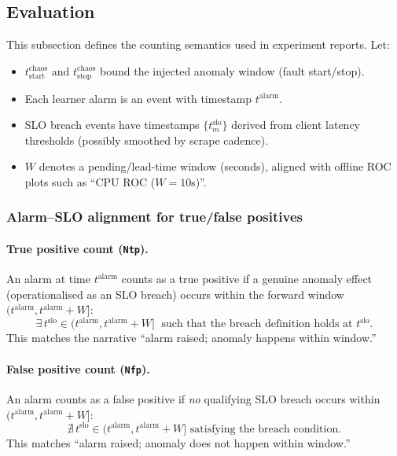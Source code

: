 \documentclass[11pt,a4paper]{article}
\begin{document}
\subsection{Evaluation}
\label{subsec:evaluation}

This subsection defines the counting semantics used in experiment reports. Let:
\begin{itemize}[leftmargin=*]
  \item $t^{\mathrm{chaos}}_{\mathrm{start}}$ and $t^{\mathrm{chaos}}_{\mathrm{stop}}$ bound the injected anomaly window (fault start/stop).
  \item Each learner alarm is an event with timestamp $t^{\mathrm{alarm}}$.
  \item SLO breach events have timestamps $\{t^{\mathrm{slo}}_m\}$ derived from client latency thresholds (possibly smoothed by scrape cadence).
  \item $W$ denotes a pending/lead-time window (seconds), aligned with offline ROC plots such as ``CPU ROC ($W{=}10$s)''.
\end{itemize}

\subsubsection*{Alarm--SLO alignment for true/false positives}

\paragraph{True positive count (\texttt{Ntp}).}
An alarm at time $t^{\mathrm{alarm}}$ counts as a true positive if a genuine anomaly effect (operationalised as an SLO breach) occurs within the forward window $(t^{\mathrm{alarm}}, t^{\mathrm{alarm}}+W]$:
\begin{equation}
  \exists\, t^{\mathrm{slo}} \in (t^{\mathrm{alarm}}, t^{\mathrm{alarm}}+W] \;\text{ such that the breach definition holds at } t^{\mathrm{slo}}.
\end{equation}
This matches the narrative ``alarm raised; anomaly happens within window.''

\paragraph{False positive count (\texttt{Nfp}).}
An alarm counts as a false positive if \emph{no} qualifying SLO breach occurs within $(t^{\mathrm{alarm}}, t^{\mathrm{alarm}}+W]$:
\begin{equation}
  \nexists\, t^{\mathrm{slo}} \in (t^{\mathrm{alarm}}, t^{\mathrm{alarm}}+W] \text{ satisfying the breach condition.}
\end{equation}
This matches ``alarm raised; anomaly does not happen within window.''
\end{document}
